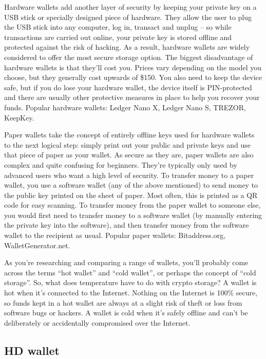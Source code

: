 Hardware wallets add another layer of security by keeping your private key on a USB stick or specially designed piece of hardware. They allow the user to plug the USB stick into any computer, log in, transact and unplug – so while transactions are carried out online, your private key is stored offline and protected against the risk of hacking. As a result, hardware wallets are widely considered to offer the most secure storage option. The biggest disadvantage of hardware wallets is that they’ll cost you. Prices vary depending on the model you choose, but they generally cost upwards of \$150. You also need to keep the device safe, but if you do lose your hardware wallet, the device itself is PIN-protected and there are usually other protective measures in place to help you recover your funds. Popular hardware wallets: Ledger Nano X, Ledger Nano S, TREZOR, KeepKey.

Paper wallets take the concept of entirely offline keys used for hardware wallets to the next logical step: simply print out your public and private keys and use that piece of paper as your wallet. As secure as they are, paper wallets are also complex and quite confusing for beginners. They’re typically only used by advanced users who want a high level of security. To transfer money to a paper wallet, you use a software wallet (any of the above mentioned) to send money to the public key printed on the sheet of paper. Most often, this is printed as a QR code for easy scanning. To transfer money from the paper wallet to someone else, you would first need to transfer money to a software wallet (by manually entering the private key into the software), and then transfer money from the software wallet to the recipient as usual. Popular paper wallets: Bitaddress.org, WalletGenerator.net.

As you’re researching and comparing a range of wallets, you’ll probably come across the terms “hot wallet” and “cold wallet”, or perhaps the concept of “cold storage”. So, what does temperature have to do with crypto storage? A wallet is hot when it's connected to the Internet. Nothing on the Internet is 100\% secure, so funds kept in a hot wallet are always at a slight risk of theft or loss from software bugs or hackers. A wallet is cold when it's safely offline and can't be deliberately or accidentally compromised over the Internet.

\subsection{HD wallet}

